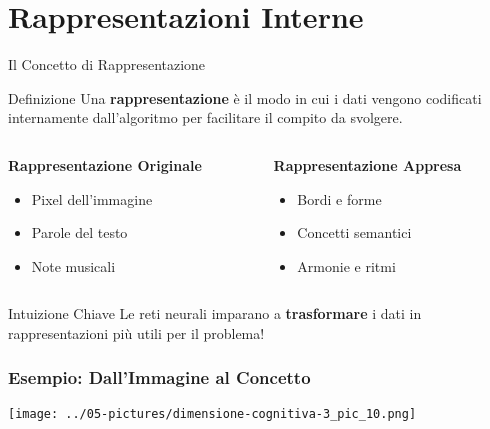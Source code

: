 \documentclass[aspectratio=169]{beamer}
\begin{document}
\section{Rappresentazioni Interne}
%
%
\begin{frame}{Il Concetto di Rappresentazione}

\begin{block}{Definizione}
Una \textbf{rappresentazione} è il modo in cui i dati vengono codificati internamente dall'algoritmo per facilitare il compito da svolgere.
\end{block}
\vspace{0.5cm}
\begin{columns}
\begin{column}{0.5\textwidth}
\textbf{Rappresentazione Originale}
\begin{itemize}
\item Pixel dell'immagine
\item Parole del testo  
\item Note musicali
\end{itemize}
\end{column}
\begin{column}{0.5\textwidth}
\textbf{Rappresentazione Appresa}
\begin{itemize}
\item Bordi e forme
\item Concetti semantici
\item Armonie e ritmi
\end{itemize}
\end{column}
\end{columns}

\pause
\vspace{.3cm}
\begin{alertblock}{Intuizione Chiave}
Le reti neurali imparano a \textbf{trasformare} i dati in rappresentazioni più utili per il problema!
\end{alertblock}

\end{frame}
%
%
\begin{frame}
\frametitle{Esempio: Dall'Immagine al Concetto}
\begin{center}
\texttt{[image: ../05-pictures/dimensione-cognitiva-3\_pic\_10.png]} 
\end{center}
\end{frame}
%
\end{document}

